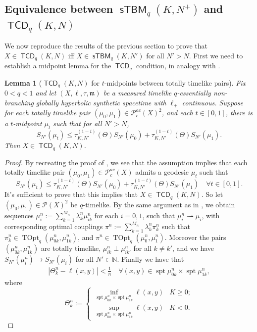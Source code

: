 \documentclass{article}
\newcommand{\N}{\mathbb{N}}
\newcommand{\m}{\mathfrak{m}}
\newcommand{\narrowto}{\rightharpoonup}
\DeclareMathOperator{\spt}{spt}
\newcommand{\Pcal}{\mathcal{P}}
\DeclareMathOperator{\TCD}{\mathsf{TCD}}
\DeclareMathOperator{\sTBM}{\mathsf{sTBM}}
\DeclareMathOperator{\TOpt}{TOpt}
\newtheorem{lemma}[theorem]{Lemma}
\theoremstyle{definition}
\begin{document}
{\subsection{Equivalence between $\sTBM_q(K,N^+)$ and $\TCD_q(K,N)$}
We now reproduce the results of the previous section to prove that $X\in \TCD_q(K,N)$ iff $X\in \sTBM_q(K,N')$ for all $N'>N$. First we need to establish a midpoint lemma for the $\TCD_q$ condition, in analogy with . 
\begin{lemma}[$\TCD_q(K,N)$ for $t$-midpoints between totally timelike pairs]\label{midpointTCD}
Fix $0<q<1$ and let $(X,\ell,\tau,\m)$ be a measured timelike $q$-essentially non-branching globally hyperbolic synthetic spacetime with $\ell_+$ continuous. Suppose for each totally timelike pair $(\mu_0,\mu_1)\in \Pcal_c^{ac}(X)^2$, and each $t\in[0,1]$, there is a $t$-midpoint $\mu_t$ such that for all $N'>N$, 
\[S_{N'}(\mu_t)\leq \tau_{K,N'}^{(1-t)}(\Theta)S_{N'}(\mu_0)+ \tau_{K,N'}^{(1-t)}(\Theta)S_{N'}(\mu_1).\]
Then $X\in \TCD_q(K,N)$. 
\end{lemma}
\begin{proof}
By recreating the proof of , we see that the assumption implies that each totally timelike pair $(\mu_0,\mu_1)\in \Pcal_c^{ac}(X)$ admits a geodesic $\mu_t$ such that  
\[S_{N'}(\mu_t)\leq \tau_{K,N'}^{(1-t)}(\Theta)S_{N'}(\mu_0)+ \tau_{K,N'}^{(1-t)}(\Theta)S_{N'}(\mu_1)\quad \forall t\in [0,1].\]
It's sufficient to prove that this implies that $X\in \TCD_q(K,N)$. So let $(\mu_0, \mu_1)\in \Pcal(X)^2$ be $q$-timelike. By the same argument as in , we obtain sequences $\mu_i^n:=\sum_{k=1}^{M_n}\lambda_k^n \mu_{ik}^n$ for each $i=0,1$, such that $\mu_i^n\narrowto \mu_i$, with corresponding optimal couplings $\pi^n:=\sum_{k=1}^{M_n}\lambda_k^n \pi_k^n$ such that $\pi_k^n \in \TOpt_q(\mu_{0k}^n, \mu_{1k}^n)$, and $\pi^n\in \TOpt_q(\mu_0^n, \mu_1^n)$. Moreover the pairs $(\mu_{0k}^n, \mu_{1k}^n)$ are totally timelike, $\mu_{ik}^n\perp \mu_{ik'}^n$ for all $k\neq k'$, and we have $S_{N'}(\mu_i^n)\to S_{N'}(\mu_i)$ for all $N'\in \N$. Finally we have that 
\begin{align}\label{Thetaellestimate}
|\Theta_k^n-\ell(x,y)|<\frac 1n\quad \forall (x,y)\in \spt\mu_{0k}^n\times \spt\mu_{1k}^n,
\end{align}
where 
\[\Theta_k^n:= \begin{cases}
\inf_{\spt\mu_{0k}^n\times \spt\mu_{1k}^n}\ell(x,y) & K\geq 0;\\
\sup_{\spt\mu_{0k}^n\times \spt\mu_{1k}^n}\ell(x,y) & K<0.
\end{cases}
\]


\end{proof}}
\end{document}
